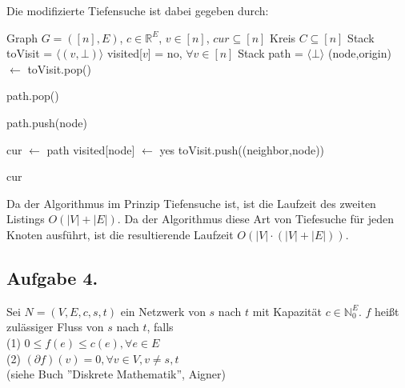 \documentclass[11pt,a4paper,ngerman]{article}
\begin{document}
Die modifizierte Tiefensuche ist dabei gegeben durch: \\

\begin{algorithmic}[1]
\Require Graph $G = ([n],E)$, $c \in \mathbb{R}^E$, $v \in [n]$, $cur \subseteq [n]$
\Ensure Kreis $C \subseteq [n]$
\State Stack toVisit = $\langle (v, \bot) \rangle$
\State visited[$v$] = no, $\forall v \in [n]$
\State Stack path = $\langle \bot \rangle$
\State (node,origin) $\gets$ toVisit.pop()

\State path.pop()
\EndWhile

\State path.push(node)

\State cur $\gets$ path
\EndIf
\Else
\State visited[node] $\gets$ yes
\State toVisit.push((neighbor,node))
\EndFor
\EndIf

\EndWhile
\State \Return cur
\end{algorithmic}

Da der Algorithmus im Prinzip Tiefensuche ist, ist die Laufzeit des zweiten Listings $O(|V| + |E|)$. Da der Algorithmus diese Art von Tiefesuche für jeden Knoten ausführt, ist die resultierende Laufzeit $O(|V| \cdot (|V| + |E|))$.

\subsection*{Aufgabe 4.}
Sei $N = (V,E,c,s,t)$ ein Netzwerk von $s$ nach $t$ mit Kapazität $c \in \mathbb{N}_0^E$.
$f$ heißt zulässiger Fluss von $s$ nach $t$, falls \\
(1) $0 \leq f(e) \leq c(e), \forall e \in E$ \\
(2) $(\partial f)(v) = 0, \forall v \in V, v \neq s, t$ \\
(siehe Buch ''Diskrete Mathematik'', Aigner) \\
\end{document}
